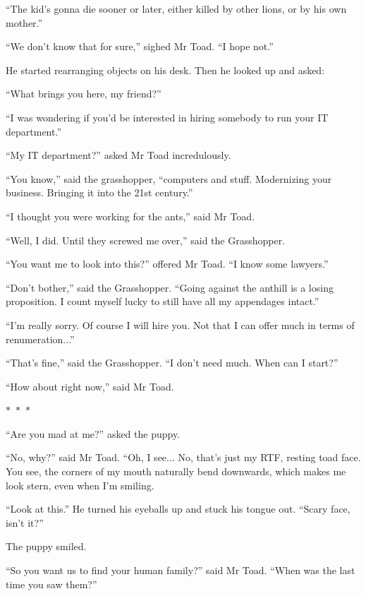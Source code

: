 \documentclass{memoir}
\newcommand{\starbreak}{%
\begin{center}
  $\ast$~$\ast$~$\ast$
\end{center}
}
\begin{document}
``The kid's gonna die sooner or later, either killed by other lions, or by his own mother.''

``We don't know that for sure,'' sighed Mr Toad. ``I hope not.''

He started rearranging objects on his desk. Then he looked up and asked:

``What brings you here, my friend?''

``I was wondering if you'd be interested in hiring somebody to run your IT department.''

``My IT department?'' asked Mr Toad incredulously.

``You know,'' said the grasshopper, ``computers and stuff. Modernizing your business. Bringing it into the 21st century.''

``I thought you were working for the ants,'' said Mr Toad.

``Well, I did. Until they screwed me over,'' said the Grasshopper. 

``You want me to look into this?'' offered Mr Toad. ``I know some lawyers.''

``Don't bother,'' said the Grasshopper. ``Going against the anthill is a losing proposition. I count myself lucky to still have all my appendages intact.''

``I'm really sorry. Of course I will hire you. Not that I can offer much in terms of renumeration...''

``That's fine,'' said the Grasshopper. ``I don't need much. When can I start?''

``How about right now,'' said Mr Toad. 

\starbreak


``Are you mad at me?'' asked the puppy.

``No, why?'' said Mr Toad. ``Oh, I see... No, that's just my RTF, resting toad face. You see, the corners of my mouth naturally bend downwards, which makes me look stern, even when I'm smiling. 

``Look at this.'' He turned his eyeballs up and stuck his tongue out. ``Scary face, isn't it?''

The puppy smiled.

``So you want us to find your human family?'' said Mr Toad. ``When was the last time you saw them?''
\end{document}
